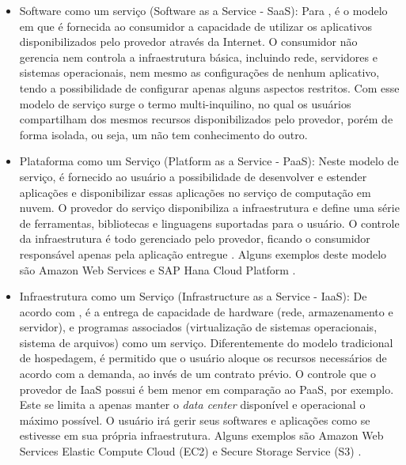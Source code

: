 \documentclass[twoside,english,brazilian]{UNISINOSartigo}
\begin{document}
\begin{itemize}
	\item Software como um serviço (Software as a Service - SaaS): Para , é o modelo em que é fornecida ao consumidor a capacidade de utilizar os aplicativos disponibilizados pelo provedor através da Internet. O consumidor não gerencia nem controla a infraestrutura básica, incluindo rede, servidores e sistemas operacionais, nem mesmo as configurações de nenhum aplicativo, tendo a possibilidade de configurar apenas alguns aspectos restritos. Com esse modelo de serviço surge o termo multi-inquilino, no qual os usuários compartilham dos mesmos recursos disponibilizados pelo provedor, porém de forma isolada, ou seja, um não tem conhecimento do outro.
	\item Plataforma como um Serviço (Platform as a Service - PaaS): Neste modelo de serviço, é fornecido ao usuário a possibilidade de desenvolver e estender aplicações e disponibilizar essas aplicações no serviço de computação em nuvem. O provedor do serviço disponibiliza a infraestrutura e define uma série de ferramentas, bibliotecas e linguagens suportadas para o usuário. O controle da infraestrutura é todo gerenciado pelo provedor, ficando o consumidor responsável apenas pela aplicação entregue \cite{Mell2012,verascloud}. Alguns exemplos deste modelo são Amazon Web Services  e SAP Hana Cloud Platform . 
	\item Infraestrutura como um Serviço (Infrastructure as a Service - IaaS): De acordo com , é a entrega de capacidade de hardware (rede, armazenamento e servidor), e programas associados (virtualização de sistemas operacionais, sistema de arquivos) como um serviço. Diferentemente do modelo tradicional de hospedagem, é permitido que o usuário aloque os recursos necessários de acordo com a demanda, ao invés de um contrato prévio. O controle que o provedor de IaaS possui é bem menor em comparação ao PaaS, por exemplo. Este se limita a apenas manter o \textit{data center} disponível e operacional o máximo possível. O usuário irá gerir seus softwares e aplicações como se estivesse em sua própria infraestrutura. Alguns exemplos são Amazon Web Services Elastic Compute Cloud (EC2) e Secure Storage Service (S3) \cite{AWS}.
\end{itemize}
\end{document}
